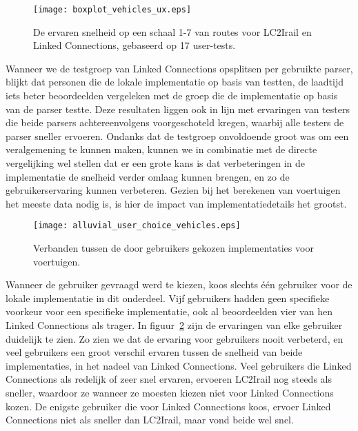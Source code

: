 \begin{figure}[h]
	\centering
	\texttt{[image: boxplot\_vehicles\_ux.eps]}
	\caption[Ervaren snelheid van routes]{De ervaren snelheid op een schaal 1-7 van routes voor LC2Irail en Linked Connections, gebaseerd op 17 user-tests.}
	\label{fig:vehiclesUx}
\end{figure}

Wanneer we de testgroep van Linked Connections opsplitsen per gebruikte parser, blijkt dat personen die de lokale implementatie op basis van  testten, de laadtijd iets beter beoordeelden vergeleken met de groep die de implementatie op basis van de  parser testte. Deze resultaten liggen ook in lijn met ervaringen van testers die beide parsers achtereenvolgens voorgeschoteld kregen, waarbij alle testers de  parser sneller ervoeren. Ondanks dat de testgroep onvoldoende groot was om een veralgemening te kunnen maken, kunnen we in combinatie met de directe vergelijking wel stellen dat er een grote kans is dat verbeteringen in de implementatie de snelheid verder omlaag kunnen brengen, en zo de gebruikerservaring kunnen verbeteren. Gezien bij het berekenen van voertuigen het meeste data nodig is, is hier de impact van implementatiedetails het grootst.

\begin{figure}[ht]
	\centering
	\texttt{[image: alluvial\_user\_choice\_vehicles.eps]}
	\caption[Door gebruikers gekozen implementatie voor voertuigen]{Verbanden tussen de door gebruikers gekozen implementaties voor voertuigen. }
	\label{fig:alluvialUserChoicesVehicles}
\end{figure}

Wanneer de gebruiker gevraagd werd te kiezen, koos slechts één gebruiker voor de lokale implementatie in dit onderdeel. Vijf gebruikers hadden geen specifieke voorkeur voor een specifieke implementatie, ook al beoordeelden vier van hen Linked Connections als trager. In figuur~\ref{fig:alluvialUserChoicesVehicles} zijn de ervaringen van elke gebruiker duidelijk te zien. Zo zien we dat de ervaring voor gebruikers nooit verbeterd, en veel gebruikers een groot verschil ervaren tussen de snelheid van beide implementaties, in het nadeel van Linked Connections. Veel gebruikers die Linked Connections als redelijk of zeer snel ervaren, ervoeren LC2Irail nog steeds als sneller, waardoor ze wanneer ze moesten kiezen niet voor Linked Connections kozen. De enigste gebruiker die voor Linked Connections koos, ervoer Linked Connections niet als sneller dan LC2Irail, maar vond beide wel snel.

